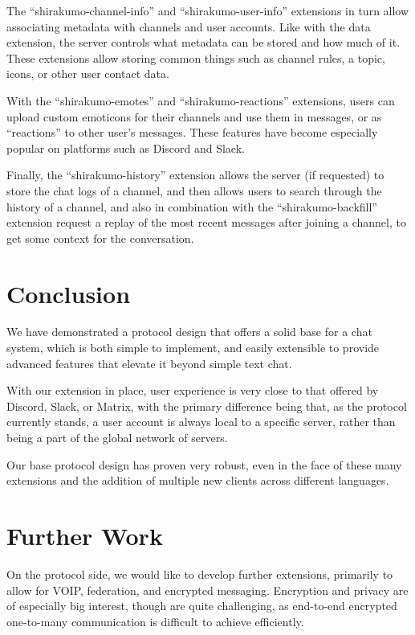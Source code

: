 \documentclass[format=sigconf]{acmart}
\begin{document}
The ``shirakumo-channel-info'' and ``shirakumo-user-info'' extensions in turn allow associating metadata with channels and user accounts. Like with the data extension, the server controls what metadata can be stored and how much of it. These extensions allow storing common things such as channel rules, a topic, icons, or other user contact data.

With the ``shirakumo-emotes'' and ``shirakumo-reactions'' extensions, users can upload custom emoticons for their channels and use them in messages, or as ``reactions'' to other user's messages. These features have become especially popular on platforms such as Discord and Slack.

Finally, the ``shirakumo-history'' extension allows the server (if requested) to store the chat logs of a channel, and then allows users to search through the history of a channel, and also in combination with the ``shirakumo-backfill'' extension request a replay of the most recent messages after joining a channel, to get some context for the conversation.

\section{Conclusion}\label{conclusion}
We have demonstrated a protocol design that offers a solid base for a chat system, which is both simple to implement, and easily extensible to provide advanced features that elevate it beyond simple text chat.

With our extension in place, user experience is very close to that offered by Discord, Slack, or Matrix, with the primary difference being that, as the protocol currently stands, a user account is always local to a specific server, rather than being a part of the global network of servers.

Our base protocol design has proven very robust, even in the face of these many extensions and the addition of multiple new clients across different languages.

\section{Further Work}\label{further-work}
On the protocol side, we would like to develop further extensions, primarily to allow for VOIP, federation, and encrypted messaging. Encryption and privacy are of especially big interest, though are quite challenging, as end-to-end encrypted one-to-many communication is difficult to achieve efficiently\cite{nabeel2017many}\cite{whisper2014}.
\end{document}

